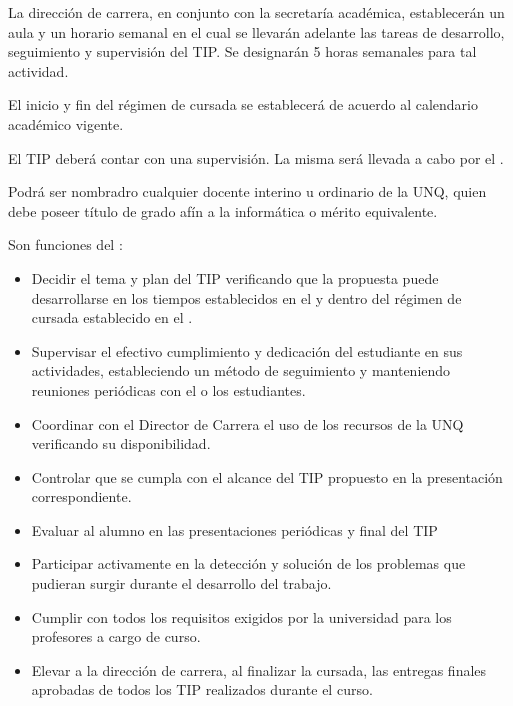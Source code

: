\articulo La dirección de carrera, en conjunto con la secretaría académica,
establecerán un aula y un horario semanal en el cual se llevarán adelante las
tareas de desarrollo, seguimiento y supervisión del TIP. Se designarán 5 horas
semanales para tal actividad.

\articulo El inicio y fin del régimen de cursada se establecerá de acuerdo al
calendario académico vigente. 


\articulo El TIP deberá contar con una supervisión. La misma será llevada a
cabo por el \profesorTIP{}. 

\articulo Podrá ser nombradro \profesorTIP{} cualquier docente interino u
ordinario de la UNQ, quien debe poseer título de grado afín a la informática o
mérito equivalente.

\articulo Son funciones del \profesorTIP{}:
\begin{itemize}
 \item Decidir el tema y plan del TIP verificando que la
 propuesta puede desarrollarse en los tiempos establecidos en el
 \artHoras y dentro del régimen de cursada establecido en el \artRegimen.
 \item Supervisar el efectivo cumplimiento y dedicación del estudiante en
 sus actividades, estableciendo un método de seguimiento y
 manteniendo reuniones periódicas con el o los estudiantes.
 \item Coordinar con el Director de Carrera el uso de los recursos de la
 UNQ verificando su disponibilidad.
 \item Controlar que se cumpla con el alcance del TIP propuesto en la
 presentación correspondiente.
 \item Evaluar al alumno en las presentaciones periódicas y final del TIP
 \item Participar activamente en la detección y solución de los problemas
 que pudieran surgir durante el desarrollo del trabajo.
 \item Cumplir con todos los requisitos exigidos por la universidad para los
 profesores a cargo de curso.
 \item Elevar a la dirección de carrera, al finalizar la cursada, las entregas
 finales aprobadas de todos los TIP realizados durante el curso.
\end{itemize}

